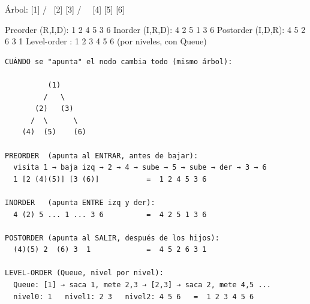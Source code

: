 \begin{dsadiagrama}
Árbol:
          [1]
        /     \
      [2]     [3]
     /   \       \
   [4]   [5]     [6]

Preorder  (R,I,D): 1  2  4  5  3  6
Inorder   (I,R,D): 4  2  5  1  3  6
Postorder (I,D,R): 4  5  2  6  3  1
Level-order      : 1  2  3  4  5  6   (por niveles, con Queue)
\end{dsadiagrama}

\begin{dsacomofunciona}
\begin{verbatim}
CUÁNDO se "apunta" el nodo cambia todo (mismo árbol):

          (1)
         /   \
       (2)   (3)
      /  \      \
    (4)  (5)    (6)

PREORDER  (apunta al ENTRAR, antes de bajar):
  visita 1 → baja izq → 2 → 4 → sube → 5 → sube → der → 3 → 6
  1 [2 (4)(5)] [3 (6)]           =  1 2 4 5 3 6

INORDER   (apunta ENTRE izq y der):
  4 (2) 5 ... 1 ... 3 6          =  4 2 5 1 3 6

POSTORDER (apunta al SALIR, después de los hijos):
  (4)(5) 2  (6) 3  1             =  4 5 2 6 3 1

LEVEL-ORDER (Queue, nivel por nivel):
  Queue: [1] → saca 1, mete 2,3 → [2,3] → saca 2, mete 4,5 ...
  nivel0: 1   nivel1: 2 3   nivel2: 4 5 6   =  1 2 3 4 5 6
\end{verbatim}
\end{dsacomofunciona}

